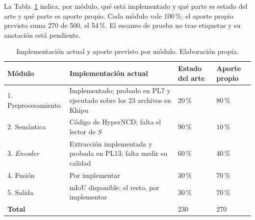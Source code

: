 La Tabla~\ref{tab:estado-impl} indica, por módulo, qué está implementado y qué
parte es estado del arte y qué parte es aporte propio. Cada módulo vale
100\,\%; el aporte propio previsto suma 270 de 500, el 54\,\%. El escaneo de
prueba no trae etiquetas y su anotación está pendiente.

\begin{table}[H]
\centering
{}\small
\caption[Implementación actual y aporte por módulo]{Implementación actual y aporte previsto por módulo. Elaboración
propia.}
\label{tab:estado-impl}
\begin{tabularx}{\linewidth}{@{}l>{\raggedright\arraybackslash}Xll@{}}
\toprule
\textbf{Módulo} & \textbf{Implementación actual} & \textbf{Estado del arte} & \textbf{Aporte propio} \\
\midrule
1. Preprocesamiento & Implementado; probado en PL7 y ejecutado sobre los 23 archivos en Khipu & 20\,\% & 80\,\% \\
2. Semántica & Código de HyperNCD; falta el lector de $S$ & 90\,\% & 10\,\% \\
3. \emph{Encoder} & Extracción implementada y probada en PL13; falta medir su calidad & 60\,\% & 40\,\% \\
4. Fusión & Por implementar & 30\,\% & 70\,\% \\
5. Salida & mIoU disponible; el resto, por implementar & 30\,\% & 70\,\% \\
\midrule
\textbf{Total} & & 230 & 270 \\
\bottomrule
\end{tabularx}
\end{table}
